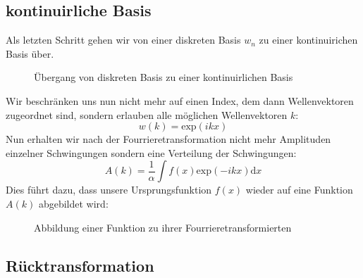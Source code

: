 \subsection{kontinuirliche Basis}
Als letzten Schritt gehen wir von einer diskreten Basis $w_n$ zu einer kontinuirichen Basis über.
\begin{figure}[H]
	\caption{Übergang von diskreten Basis zu einer kontinuirlichen Basis}
\end{figure}
Wir beschränken uns nun nicht mehr auf einen Index, dem dann Wellenvektoren zugeordnet sind, sondern erlauben alle möglichen Wellenvektoren $k$:
\begin{equation}
	w(k) = \mathrm{exp}(ikx)
\end{equation}
Nun erhalten wir nach der Fourrieretransformation nicht mehr Amplituden einzelner Schwingungen sondern eine Verteilung der Schwingungen:
\begin{equation}
	A(k) = \frac{1}{\alpha} \int f(x) \mathrm{exp}(-ikx) \mathrm{d}x
\end{equation}
Dies führt dazu, dass unsere Ursprungsfunktion $f(x)$ wieder auf eine Funktion $A(k)$ abgebildet wird:
\begin{figure}[H]
	\caption{Abbildung einer Funktion zu ihrer Fourrieretransformierten}
\end{figure}
\subsection{Rücktransformation}

